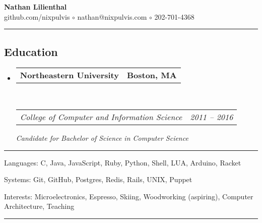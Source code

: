 \documentclass[10pt,letterpaper]{article}
\makeatletter
\newenvironment{indentsection}[1]%
{\begin{list}{}%
  {\setlength{\leftmargin}{#1}}%
  \item[]%
}
{\end{list}}
\newcommand{\headerrow}[2]
{\begin{tabular*}{\linewidth}{l@{\extracolsep{\fill}}r}
  #1 &
  #2 \\
\end{tabular*}}
\makeatother
\begin{document}
\begin{center}
{\huge \textbf{Nathan Lilienthal}}\\\vspace{.2ex}
{\large github.com/nixpulvis $\circ$ nathan@nixpulvis.com $\circ$ 202-701-4368}\vspace{-1ex}
\end{center}

\hrule
\vspace{-0.4em}
\subsection*{Education}

\begin{itemize}
  \parskip=0.1em

  \item 
  \headerrow
    {\textbf{Northeastern University}}
    {\textbf{Boston, MA}}
  \\
  \headerrow
    {\emph{College of Computer and Information Science}}
    {\emph{2011 -- 2016}}
    {\emph{Candidate for Bachelor of Science in Computer Science}}

\end{itemize}


\hrule

\begin{indentsection}{\parindent}
\begin{description*}
  \item[Languages:]
  C, Java, JavaScript, Ruby, Python, Shell, LUA, Arduino, Racket
  \item[Systems:]
  Git, GitHub, Postgres, Redis, Rails, UNIX, Puppet
  \item[Interests:]
  Microelectronics, Espresso, Skiing, Woodworking (aspiring), Computer Architecture, Teaching
\end{description*}
\end{indentsection}


\hrule
\vspace{-0.4em}
\end{document}
